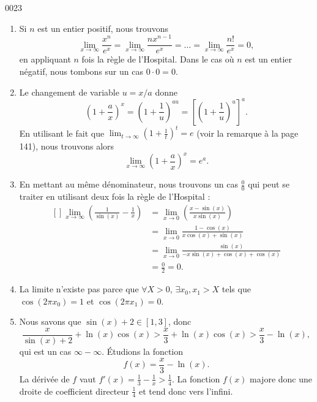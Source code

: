 \begin{corrige}{0023}
\begin{enumerate}
\item
Si $n$ est un entier positif, nous trouvons
\begin{equation}
	\lim_{x\to\infty}\frac{ x^n }{  e^{x} }=\lim_{x\to\infty}\frac{ nx^{n-1} }{ e^x }=\ldots=\lim_{x\to \infty}\frac{ n! }{ e^x }=0,
\end{equation}
en appliquant $n$ fois la règle de l'Hospital. Dans le cas où $n$ est un entier négatif, nous tombons sur un cas $0\cdot0=0$.

\item
Le changement de variable $u=x/a$ donne
\begin{equation}
	\left( 1+\frac{ a }{ x } \right)^x=\left( 1+\frac{1}{ u } \right)^{au}=\left[ \left( 1+\frac{1}{ u } \right)^u \right]^a.
\end{equation}
En utilisant le fait que $\lim_{t\to\infty}\left( 1+\frac{1}{ t } \right)^t=e$ (voir la remarque à la page 141), nous trouvons alors
\begin{equation}
	\lim_{x\to\infty}\left( 1+\frac{ a }{ x } \right)^x=e^a.
\end{equation}

\item
En mettant au même dénominateur, nous trouvons un cas $\frac{ 0 }{ 0 }$ qui peut se traiter en utilisant deux fois la règle de l'Hospital :
\begin{equation}
	\begin{aligned}[]
	\lim_{x\to\infty}\left( \frac{1}{ \sin(x) }-\frac{1}{ x } \right)&=\lim_{x\to 0}\left( \frac{ x-\sin(x) }{ x\sin(x) } \right)\\
				&=\lim_{x\to 0}\frac{ 1-\cos(x) }{ x\cos(x)+\sin(x) }\\
				&=\lim_{x\to 0}\frac{ \sin(x) }{ -x\sin(x)+\cos(x)+\cos(x) }\\
				&=\frac{ 0 }{ 2 }=0.
	\end{aligned}
\end{equation}

\item
La limite n'existe pas parce que $\forall X>0$, $\exists x_0,x_1>X$ tels que $\cos(2\pi x_0)=1$ et $\cos(2\pi x_1)=0$.

\item
Nous savons que $\sin(x)+2\in[1,3]$, donc
\begin{equation}
	\frac{ x }{ \sin(x)+2 }+\ln(x)\cos(x)>\frac{ x }{ 3 }+\ln(x)\cos(x)>\frac{ x }{ 3 }-\ln(x),
\end{equation}
qui est un cas $\infty-\infty$. Étudions la fonction
\begin{equation}		\label{Eq0023ffrac}
	f(x)=\frac{ x }{ 3 }-\ln(x).
\end{equation}
La dérivée de $f$ vaut $f'(x)=\frac{1}{ 3 }-\frac{1}{ x }>\frac{1}{ 4 }$. La fonction $f(x)$ majore donc une droite de coefficient directeur $\frac{ 1 }{ 4 }$ et tend donc vers l'infini.


\end{enumerate}
\end{corrige}
